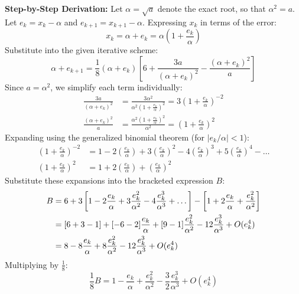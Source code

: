 \documentclass[11pt,a4paper]{article}
\numberwithin{equation}{section}
\begin{document}
\begin{solbox}
\textbf{Step-by-Step Derivation:}
Let $\alpha = \sqrt{a}$ denote the exact root, so that $\alpha^2 = a$. Let $e_k = x_k - \alpha$ and $e_{k+1} = x_{k+1} - \alpha$. 
Expressing $x_k$ in terms of the error:
\begin{equation}
    x_k = \alpha + e_k = \alpha \left( 1 + \frac{e_k}{\alpha} \right)
\end{equation}
Substitute into the given iterative scheme:
\begin{equation}
    \alpha + e_{k+1} = \frac{1}{8} (\alpha + e_k) \left[ 6 + \frac{3a}{(\alpha + e_k)^2} - \frac{(\alpha + e_k)^2}{a} \right]
\end{equation}
Since $a = \alpha^2$, we simplify each term individually:
\begin{align}
    \frac{3a}{(\alpha + e_k)^2} &= \frac{3\alpha^2}{\alpha^2 \left(1 + \frac{e_k}{\alpha}\right)^2} = 3 \left( 1 + \frac{e_k}{\alpha} \right)^{-2} \\
    \frac{(\alpha + e_k)^2}{a} &= \frac{\alpha^2 \left(1 + \frac{e_k}{\alpha}\right)^2}{\alpha^2} = \left( 1 + \frac{e_k}{\alpha} \right)^2
\end{align}
Expanding using the generalized binomial theorem (for $|e_k/\alpha| < 1$):
\begin{align}
    \left( 1 + \frac{e_k}{\alpha} \right)^{-2} &= 1 - 2\left(\frac{e_k}{\alpha}\right) + 3\left(\frac{e_k}{\alpha}\right)^2 - 4\left(\frac{e_k}{\alpha}\right)^3 + 5\left(\frac{e_k}{\alpha}\right)^4 - \dots \\
    \left( 1 + \frac{e_k}{\alpha} \right)^2 &= 1 + 2\left(\frac{e_k}{\alpha}\right) + \left(\frac{e_k}{\alpha}\right)^2
\end{align}
Substitute these expansions into the bracketed expression $B$:
\begin{align}
    B &= 6 + 3\left[ 1 - 2\frac{e_k}{\alpha} + 3\frac{e_k^2}{\alpha^2} - 4\frac{e_k^3}{\alpha^3} + \dots \right] - \left[ 1 + 2\frac{e_k}{\alpha} + \frac{e_k^2}{\alpha^2} \right] \notag \\
    &= [6 + 3 - 1] + [-6 - 2]\frac{e_k}{\alpha} + [9 - 1]\frac{e_k^2}{\alpha^2} - 12\frac{e_k^3}{\alpha^3} + O(e_k^4) \notag \\
    &= 8 - 8\frac{e_k}{\alpha} + 8\frac{e_k^2}{\alpha^2} - 12\frac{e_k^3}{\alpha^3} + O(e_k^4)
\end{align}
Multiplying by $\frac{1}{8}$:
\begin{equation}
    \frac{1}{8} B = 1 - \frac{e_k}{\alpha} + \frac{e_k^2}{\alpha^2} - \frac{3}{2}\frac{e_k^3}{\alpha^3} + O(e_k^4)

\end{equation}
\end{solbox}
\end{document}

